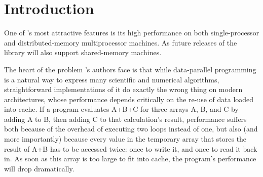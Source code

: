 \chapter{Introduction}
\label{sec:Introduction}
One of \ippl 's most attractive features is its high performance on both single-processor and distributed-memory multiprocessor machines. As future releases of the library will also support shared-memory machines.

The heart of the problem \ippl 's authors face is that while data-parallel programming is a natural way to express many scientific and numerical algorithms, straightforward implementations of it do exactly the wrong thing on modern architectures, whose performance depends critically on the re-use of data loaded into cache. If a program evaluates A+B+C for three arrays A, B, and C by adding A to B, then adding C to that calculation's result, performance suffers both because of the overhead of executing two loops instead of one, but also (and more importantly) because every value in the temporary array that stores the result of A+B has to be accessed twice: once to write it, and once to read it back in. As soon as this array is too large to fit into cache, the program's performance will drop dramatically.




